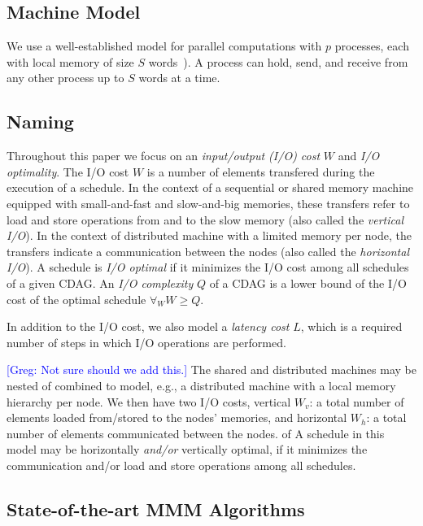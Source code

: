\documentclass[sigplan,review,anonymous]{acmart}\settopmatter{printfolios=true,printccs=false,printacmref=false}
\newcommand\greg[1]{\textcolor{blue}{[Greg: #1]}}
\begin{document}
\subsection{Machine Model}

We use a well-established model for parallel computations with $p$
processes, each with local memory of size $S$ words~\cite{CARMA,25d}).
A process can hold, send, and receive from any other process up to $S$ words at 
a time. 

\subsection{Naming}
%
Throughout this paper we focus on an \emph{input/output (I/O) cost} $W$ and 
\emph{I/O 
optimality}. 
The 
I/O cost $W$ is a number of elements transfered during the execution 
of a schedule. In the context of a sequential or shared memory machine equipped 
with small-and-fast and slow-and-big memories, these transfers refer to load 
and store operations from and to the slow memory (also called the 
\emph{vertical 
I/O}). In the context of distributed machine with a limited memory per node, 
the 
transfers indicate a communication between the nodes (also called the
\emph{horizontal I/O}). A schedule is \emph{I/O optimal} if it minimizes the 
I/O cost among all schedules of a given CDAG. An \emph{I/O complexity} $Q$ of a 
CDAG is a lower bound of the I/O cost of the optimal schedule $\forall_W W \ge 
Q$.

In addition to the I/O cost, we also model a \emph{latency cost} $L$, which is 
a required number of steps in which I/O operations are performed.

\greg{Not sure should we add this.}
The shared and distributed machines may be nested of combined to model, e.g., a 
distributed machine with a local memory hierarchy per node. We then have two 
I/O costs, vertical $W_v$: a total number of elements loaded from/stored to the 
nodes' memories, and horizontal $W_h$: a total number of elements communicated 
between the nodes. of A schedule in this 
model may be horizontally \emph{and/or} vertically optimal, if it minimizes the 
communication and/or load and store operations among all schedules.


\subsection{State-of-the-art MMM Algorithms}
\end{document}
